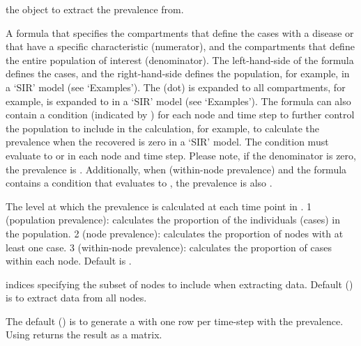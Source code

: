 \documentclass[letterpaper]{book}
\begin{document}
\begin{Arguments}
\begin{ldescription}
\item[\code{model}] the  object to extract the
prevalence from.

\item[\code{formula}] A formula that specifies the compartments that
define the cases with a disease or that have a specific
characteristic (numerator), and the compartments that define
the entire population of interest (denominator). The
left-hand-side of the formula defines the cases, and the
right-hand-side defines the population, for example,
 in a `SIR' model (see
`Examples'). The   (dot) is expanded to all
compartments, for example,   is expanded to
 in a `SIR' model (see
`Examples'). The formula can also contain a condition
(indicated by \code{|}) for each node and time step to further
control the population to include in the calculation, for
example,  to calculate the prevalence
when the recovered is zero in a `SIR' model. The
condition must evaluate to  or  in each
node and time step. Please note, if the denominator is zero,
the prevalence is . Additionally, when
 (within-node prevalence) and the formula
contains a condition that evaluates to , the
prevalence is also .

\item[\code{level}] The level at which the prevalence is calculated at
each time point in . 1 (population prevalence):
calculates the proportion of the individuals (cases) in the
population. 2 (node prevalence): calculates the proportion of
nodes with at least one case. 3 (within-node prevalence):
calculates the proportion of cases within each node. Default
is .

\item[\code{index}] indices specifying the subset of nodes to include
when extracting data. Default () is to
extract data from all nodes.

\item[\code{format}] The default () is to
generate a  with one row per time-step with
the prevalence. Using  returns the
result as a matrix.
\end{ldescription}
\end{Arguments}
\end{document}
